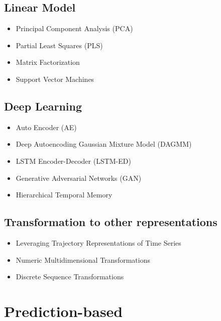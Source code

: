 \subsection{Linear Model}

\begin{itemize}
    \item Principal Component Analysis (PCA) \cite{Li2019a}
    \item Partial Least Squares (PLS) \cite{Li2019a}
    \item Matrix Factorization \cite{Aggarwal2013a}
    \item Support Vector Machines \cite{Aggarwal2013a}
\end{itemize}

\subsection{Deep Learning}

\begin{itemize}
    \item Auto Encoder (AE) \cite{Li2019a}
    \item Deep Autoencoding Gaussian Mixture Model (DAGMM) \cite{Li2019a}
    \item LSTM Encoder-Decoder (LSTM-ED) \cite{Li2019a}
    \item Generative Adversarial Networks (GAN) \cite{Li2019a}
    \item Hierarchical Temporal Memory
\end{itemize}

\subsection{Transformation to other representations}

\begin{itemize}
    \item Leveraging Trajectory Representations of Time Series \cite{Aggarwal2013a}
    \item Numeric Multidimensional Transformations \cite{Aggarwal2013a}
    \item Discrete Sequence Transformations \cite{Aggarwal2013a}
\end{itemize}

\newpage



\section{Prediction-based}

